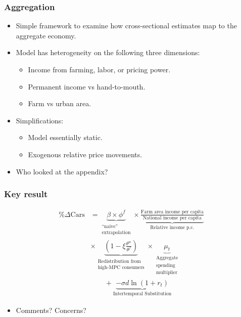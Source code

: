 \documentclass[english,xcolor=svgnames]{beamer}
\begin{document}
\begin{frame}
\frametitle{Aggregation}

\begin{itemize}
\item Simple framework to examine how cross-sectional estimates map to the aggregate economy.
\item Model has heterogeneity on the following three dimensions:
\begin{itemize}
	\item Income from farming, labor, or pricing power.
	\item Permanent income vs hand-to-mouth.
	\item Farm vs urban area.
\end{itemize}
\item Simplifications:
\begin{itemize}
	\item Model essentially static.
	\item Exogenous relative price movements.
\end{itemize}
\item Who looked at the appendix?
\end{itemize}

\end{frame}

\begin{frame}
\frametitle{Key result}
\vspace{-0.8cm}
\begin{align*}
	\% \Delta \text{Cars} &= \underbrace{\beta \times
                         \phi^{f}}_{\substack{\text{``naive''} \\
  \text{extrapolation}}} \times  \underbrace{\frac{\text{Farm
  area income per capita}}{\text{National income per
  capita}}}_{\text{Relative income p.c.}} \\
  & \times  \underbrace{\left( 1-\xi\frac{\theta^{w}}{\theta^{f}} \right)}_{\substack{\text{Redistribution from } \\ \text{high-MPC consumers}}} \times \underbrace{\mu_{t}}_{\substack{\text{Aggregate}\\ \text{spending}\\ \text{multiplier}}} \\
  &\qquad  + \underbrace{-\sigma  d\ln (1+r_t)}_{\text{Intertemporal Substitution}}
\end{align*}
\begin{itemize}
	\item Comments? Concerns?
\end{itemize}

\end{frame}
\end{document}
